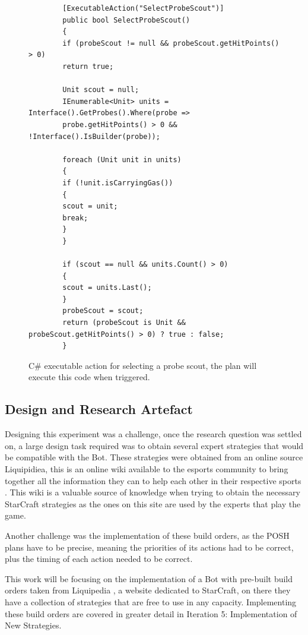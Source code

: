 \documentclass[journal]{IEEEtran}
\begin{document}
	\begin{figure}
		\begin{lstlisting}
		[ExecutableAction("SelectProbeScout")]
		public bool SelectProbeScout()
		{
		if (probeScout != null && probeScout.getHitPoints() > 0)
		return true;
		
		Unit scout = null;
		IEnumerable<Unit> units = Interface().GetProbes().Where(probe =>
		probe.getHitPoints() > 0 && !Interface().IsBuilder(probe));
		
		foreach (Unit unit in units)
		{
		if (!unit.isCarryingGas())
		{
		scout = unit;
		break;
		}
		}
		
		if (scout == null && units.Count() > 0)
		{
		scout = units.Last();
		}
		probeScout = scout;
		return (probeScout is Unit && probeScout.getHitPoints() > 0) ? true : false;
		}
		\end{lstlisting}
		\caption{C\# executable action for selecting a probe scout, the plan will execute this code when triggered.}
		\label{Fi4}
	\end{figure}
	
	\subsection{Design and Research Artefact}
	Designing this experiment was a challenge, once the research question was settled on, a large design task required was to obtain several expert strategies that would be compatible with the Bot. These strategies were obtained from an online source Liquipidiea, this is an online wiki available to the esports community to bring together all the information they can to help each other in their respective sports \cite{Liquid}. This wiki is a valuable source of knowledge when trying to obtain the necessary StarCraft strategies as the ones on this site are used by the experts that play the game. 
	
	Another challenge was the implementation of these build orders, as the POSH plans have to be precise, meaning the priorities of its actions had to be correct, plus the timing of each action needed to be correct. 
	
	This work will be focusing on the implementation of a Bot with pre-built build orders taken from Liquipedia \cite{Liquid}, a website dedicated to StarCraft, on there they have a collection of strategies that are free to use in any capacity. Implementing these build orders are covered in greater detail in Iteration 5: Implementation of New Strategies.
	
\end{document}
